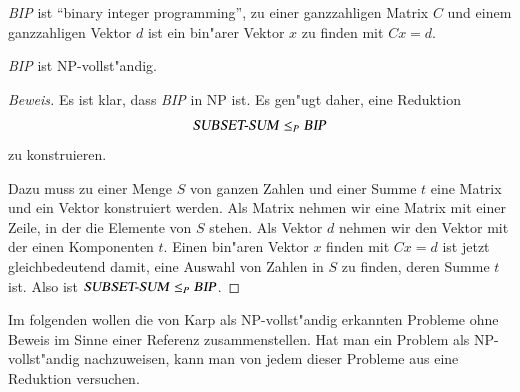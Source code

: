 \textsl{BIP} ist ``binary integer programming'', zu einer ganzzahligen
Matrix $C$ und einem ganzzahligen Vektor $d$ ist ein bin"arer
Vektor $x$ zu finden mit $Cx=d$.

\begin{satz}
\textsl{BIP} ist NP-vollst"andig.
\end{satz}

\begin{proof}[Beweis]
Es ist klar, dass \textsl{BIP} in NP ist. Es gen"ugt daher, eine
Reduktion
\[
\text{\textsl{SUBSET-SUM}}\le_P\text{\textsl{BIP}}
\]
zu konstruieren.

Dazu muss zu einer Menge $S$ von ganzen Zahlen und einer Summe $t$
eine Matrix und ein Vektor konstruiert werden. Als Matrix nehmen wir
eine Matrix mit einer Zeile, in der die Elemente von $S$ stehen. Als
Vektor $d$ nehmen wir den Vektor mit der einen Komponenten $t$.
Einen bin"aren Vektor $x$ finden mit $Cx=d$ ist jetzt gleichbedeutend
damit, eine Auswahl von Zahlen in $S$ zu finden, deren Summe $t$ ist.
Also ist
$\text{\textsl{SUBSET-SUM}}\le_P\text{\textsl{BIP}}$.
\end{proof}

Im folgenden wollen die von Karp als NP-vollst"andig erkannten Probleme
ohne Beweis im Sinne einer Referenz zusammenstellen. Hat man ein
Problem als NP-vollst"andig nachzuweisen, kann man von jedem dieser
Probleme aus eine Reduktion versuchen.


